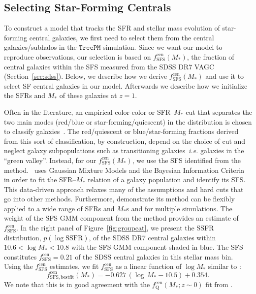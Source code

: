 \documentclass[12pt, letterpaper, preprint, tighten]{aastex62}
\newcommand{\beq}{\begin{equation}}
\newcommand{\eeq}{\end{equation}}
\begin{document}
\subsection{Selecting Star-Forming Centrals}  \label{sec:sfcen}
To construct a model that tracks the SFR and stellar mass evolution of
star-forming central galaxies, we first need to select them from the
central galaxies/subhalos in the $\mathtt{TreePM}$ simulation. Since
we want our model to reproduce observations, our selection is based
on $f^\mathrm{cen}_\mathrm{SFS}(M_*)$, the fraction of central galaxies
within the SFS measured from the SDSS DR7 VAGC (Section~\ref{sec:sdss}).
Below, we describe how we derive $f^\mathrm{cen}_\mathrm{SFS}(M_*)$ and
use it to select SF central galaxies in our model. Afterwards
we describe how we initialize the SFRs and $M_*$ of these galaxies at
$z = 1$.

Often in the literature, an empirical color-color or SFR--$M_*$ cut
that separates the two main modes (red/blue or star-forming/quiescent)
in the distribution is chosen to classify
galaxies~\citep[\emph{e.g.}][]{baldry2006, blanton2009, drory2009, peng2010, moustakas2013, hahn2015}.
The red/quiescent or blue/star-forming fractions derived from this sort
of classification, by construction, depend on the choice of cut and
neglect galaxy subpopulations such as transitioning galaxies~\emph{i.e.}
galaxies in the ``green valley''. Instead, for our $f^\mathrm{cen}_\mathrm{SFS}(M_*)$,
we use the SFS identified from the \cite{hahn2018a} method. \cite{hahn2018a}~uses Gaussian
Mixture Models and the Bayesian Information Criteria in order to fit the
SFR--$M_*$ relation of a galaxy population and identify its SFS. This
data-driven approach relaxes many of the assumptions and hard cuts that
go into other methods. Furthermore, \cite{hahn2018a} demonstrate its method can
be flexibly applied to a wide range of SFRs and $M_*$s and for multiple
simulations. The weight of the SFS GMM component from the method provides
an estimate of $f^\mathrm{cen}_\mathrm{SFS}$. In the right panel of
Figure~\ref{fig:groupcat}, we present the SSFR distribution, $p(\log \mathrm{SSFR})$,
of the SDSS DR7 central galaxies within $10.6 < \log M_* < 10.8$ with
the SFS GMM component shaded in blue.
The SFS constitutes $f^\mathrm{cen}_\mathrm{SFS} = 0.21$ of the SDSS
central galaxies in this stellar mass bin. Using the $f^\mathrm{cen}_\mathrm{SFS}$
estimates, we fit $f^\mathrm{cen}_\mathrm{SFS}$ as a linear function of
$\log M_*$ similar to \cite{wetzel2013,hahn2017b}:
\beq \label{eq:f_cen_sfms}
f^\mathrm{cen}_\mathrm{SFS, bestfit}(M_*) = -0.627\,(\log\,M_* - 10.5) + 0.354.
\eeq
We note that this is in good agreement with the $f_\mathrm{Q}^\mathrm{cen}(M_*; z \sim 0)$
fit from \cite{hahn2017b}.
\end{document}
